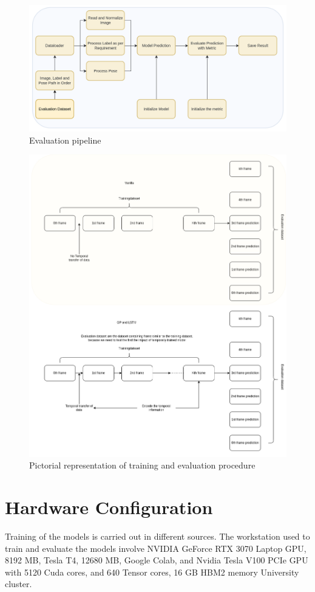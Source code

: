 	\begin{figure}
		\centering
		\includegraphics[width=14cm]{images/evaluation.png}
		\caption{Evaluation pipeline}
		\label{fig:unet_evaluation}
	\end{figure}

	\begin{figure}
		\centering
		\includegraphics[width=14cm]{images/training_and_evaluation.png}
		\caption{Pictorial representation of training and evaluation procedure}
		\label{fig:unet_evaluation}
	\end{figure}

    \section{Hardware Configuration}
    
    Training of the models is carried out in different sources. The workstation used to train and evaluate the models involve NVIDIA GeForce RTX 3070 Laptop GPU, 8192 MB, Tesla T4, 12680 MB, Google Colab, and Nvidia Tesla V100 PCIe GPU with 5120 Cuda cores, and 640 Tensor cores, 16 GB HBM2 memory University cluster. 
    


